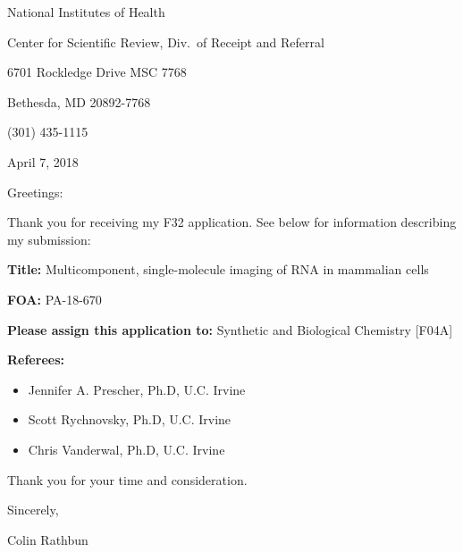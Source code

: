 \documentclass{F32}
\begin{document}
National Institutes of Health

Center for Scientific Review, Div.\ of Receipt and Referral

6701 Rockledge Drive MSC 7768

Bethesda, MD 20892-7768

(301) 435-1115

\vspace{0.5cm}
April 7, 2018

\vspace{0.5cm}
Greetings:

Thank you for receiving my F32 application. See below for information describing my submission:

\vspace{0.5cm}
\textbf{Title:} Multicomponent, single-molecule imaging of RNA in mammalian cells

\vspace{0.5cm}
\textbf{FOA:} PA-18-670

\vspace{0.5cm}
\textbf{Please assign this application to:} Synthetic and Biological Chemistry [F04A]

\vspace{0.5cm}
\textbf{Referees:}
\begin{itemize}
  \item Jennifer A. Prescher, Ph.D, U.C. Irvine
  \item Scott Rychnovsky, Ph.D, U.C. Irvine
  \item Chris Vanderwal, Ph.D, U.C. Irvine
\end{itemize}
\vspace{2cm}
Thank you for your time and consideration.

\vspace{0.5cm}
Sincerely,

\vspace{3cm}
Colin Rathbun
\end{document}

